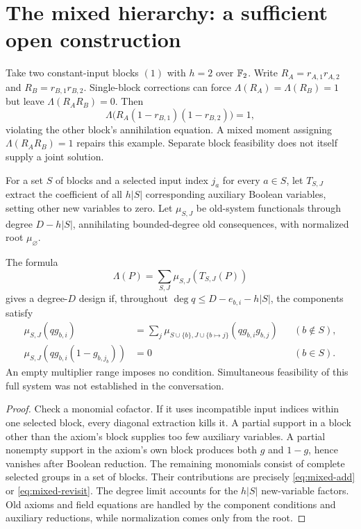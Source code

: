 \section{The mixed hierarchy: a sufficient open construction}
\begin{example}\label{ex:mixedfailure}
Take two constant-input blocks $(1)$ with $h=2$ over $\mathbb F_2$. Write $R_A=r_{A,1}r_{A,2}$ and $R_B=r_{B,1}r_{B,2}$. Single-block corrections can force $\Lambda(R_A)=\Lambda(R_B)=1$ but leave $\Lambda(R_AR_B)=0$. Then
\[
 \Lambda\bigl(R_A(1-r_{B,1})(1-r_{B,2})\bigr)=1,
\]
violating the other block's annihilation equation. A mixed moment assigning $\Lambda(R_AR_B)=1$ repairs this example. Separate block feasibility does not itself supply a joint solution.
\end{example}

For a set $S$ of blocks and a selected input index $j_a$ for every $a\in S$, let $T_{S,J}$ extract the coefficient of all $h|S|$ corresponding auxiliary Boolean variables, setting other new variables to zero. Let $\mu_{S,J}$ be old-system functionals through degree $D-h|S|$, annihilating bounded-degree old consequences, with normalized root $\mu_\varnothing$.

\begin{lemma}\label{lem:mixedsystem}
The formula
\[
 \Lambda(P)=\sum_{S,J}\mu_{S,J}(T_{S,J}(P))
\]
gives a degree-$D$ design if, throughout $\deg q\le D-e_{b,i}-h|S|$, the components satisfy
\begin{align}
 \mu_{S,J}(qg_{b,i})&=\sum_j
 \mu_{S\cup\{b\},J\cup\{b\mapsto j\}}(qg_{b,i}g_{b,j})
 &&(b\notin S),\label{eq:mixed-add}\\
 \mu_{S,J}(qg_{b,i}(1-g_{b,j_b}))&=0
 &&(b\in S).\label{eq:mixed-revisit}
\end{align}
An empty multiplier range imposes no condition. Simultaneous feasibility of this full system was not established in the conversation.
\end{lemma}
\begin{proof}
Check a monomial cofactor. If it uses incompatible input indices within one selected block, every diagonal extraction kills it. A partial support in a block other than the axiom's block supplies too few auxiliary variables. A partial nonempty support in the axiom's own block produces both $g$ and $1-g$, hence vanishes after Boolean reduction. The remaining monomials consist of complete selected groups in a set of blocks. Their contributions are precisely \eqref{eq:mixed-add} or \eqref{eq:mixed-revisit}. The degree limit accounts for the $h|S|$ new-variable factors. Old axioms and field equations are handled by the component conditions and auxiliary reductions, while normalization comes only from the root.
\end{proof}

